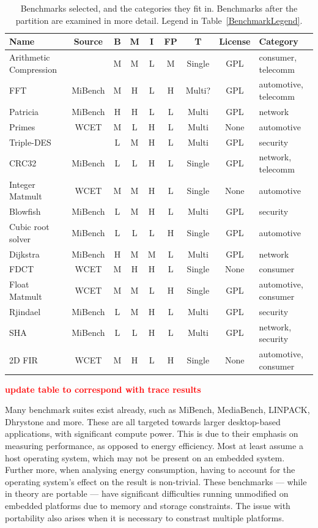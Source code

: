 \documentclass[twocolumn]{article}
\newcommand{\todo}[1]{\textbf{\textcolor{red}{#1}}}
\begin{document}
\begin{table}[th!]
\centering
	\begin{tabular}{l c c c c c c c l}
	Name				 	& Source 	& B & M & I & FP& T 		& License & Category \\
	\hline
	Arithmetic Compression	&			& M & M & L & M & Single 	& GPL	& consumer, telecomm	\\
	FFT						& MiBench 	& M & H & L & H & Multi?	&  GPL	& automotive, telecomm	\\
	Patricia				& MiBench 	& H & H & L & L & Multi 	& GPL	& network	\\
	Primes					& WCET 		& M & L & H & L & Multi 	& None	& automotive	\\
	Triple-DES				&		 	& L & M & H & L & Multi 	& GPL	& security	\\
	\hline
	CRC32					& MiBench 	& L & L & H & L & Single 	& GPL	& network, telecomm	\\
	Integer Matmult			& WCET	 	& M & M & H & L & Single 	& None	& automotive	\\
	Blowfish				& MiBench 	& L & M & H & L & Multi 	& GPL	& security	\\
	Cubic root solver		& MiBench 	& L & L & L & H & Single 	& GPL	& automotive	\\
	Dijkstra				& MiBench 	& H & M & M & L & Multi 	& GPL	& network	\\
	FDCT					& WCET 		& M & H & H & L & Single 	& None	& consumer	\\
	Float Matmult			& WCET 		& M & M & L & H & Single 	& GPL	& automotive, consumer	\\
	Rjindael				& MiBench 	& L & M & H & L & Multi 	& GPL	& security	\\
	SHA						& MiBench 	& L & L & H & L & Multi 	& GPL	& network, security	\\
	2D FIR					& WCET 		& M & H & L & H & Single 	& None	& automotive, consumer	\\
	\end{tabular}
\caption{Benchmarks selected, and the categories they fit in. Benchmarks after the partition are examined in more detail. Legend in Table~\ref{BenchmarkLegend}.}
\label{Table:BenchmarkTable}
\end{table}

\todo{update table to correspond with trace results}

Many benchmark suites exist already, such as MiBench\cite{Guthaus2001}, MediaBench\cite{Fritts2009}, LINPACK\cite{Dongarra2003}, Dhrystone\cite{Weicker1988} and more. These are all targeted towards larger desktop-based applications, with significant compute power. This is due to their emphasis on measuring performance, as opposed to energy efficiency. Most at least assume a host operating system, which may not be present on an embedded system. Further more, when analysing energy consumption, having to account for the operating system’s effect on the result is non-trivial. These benchmarks --- while in theory are portable --- have significant difficulties running unmodified on embedded platforms due to memory and storage constraints. The issue with portability also arises when it is necessary to constrast multiple platforms.
\end{document}
